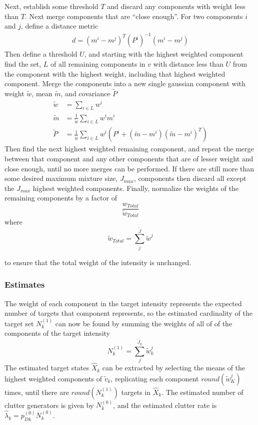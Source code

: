 \documentclass{article}
\begin{document}
Next, establish some threshold $T$ and discard any components with weight less than $T$. Next merge components that are ``close enough''. For two components $i$ and $j$, define a distance metric
\begin{align}
  \label{eq:gauss_dist}
  d = (m^i - m^j)^T(P^i)^{-1}(m^i - m^j)
\end{align}
Then define a threshold $U$, and starting with the highest weighted component find the set, $L$ of all remaining components in $v$ with distance less than $U$ from the component with the highest weight, including that highest weighted component. Merge the components into a new single gaussian component with weight $\tilde{w}$, mean $\tilde{m}$, and covariance $\tilde{P}$
\begin{align}
  \tilde{w} &= \sum_{i \in L}w^i \label{eq:gauss_merge_w}\\
  \tilde{m} &= \frac{1}{\tilde{w}}\sum_{i \in L}w^im^i \label{eq:gauss_merge_m}\\
  \tilde{P} &= \frac{1}{\tilde{w}}\sum_{i \in L}w^i(P^i + (\tilde{m} - m^i)(\tilde{m} - m^i)^T) \label{eq:gauss_merge_P}
\end{align}
Then find the next highest weighted remaining component, and repeat the merge between that component and any other components that are of lesser weight and close enough, until no more merges can be performed. If there are still more than some desired maximum mixture size, $J_{max}$, components then discard all except the $J_{max}$ highest weighted components. Finally, normalize the weights of the remaining components by a factor of
\begin{equation}
  \label{eq:wnorm}
  \frac{w_{Total}}{\tilde{w}_{Total}}
\end{equation}
where
\begin{equation}
  \label{eq:wtild_total}
  \tilde{w}_{Total} = \sum_j^{\tilde{J}}\tilde{w}^j
\end{equation}

to ensure that the total weight of the intensity is unchanged.

\subsubsection*{Estimates}
The weight of each component in the target intensity represents the expected number of targets that component represents, so the estimated cardinality of the target set $N_k^{(1)}$ can now be found by summing the weights of all of of the components of the target intensity
\begin{equation}
  \label{eq:N1k}
  N_k^{(1)} = \sum_j^{\tilde{J}_k}\tilde{w}_k^j
\end{equation}
The estimated target states $\hat{X}_k$ can be extracted by selecting the means of the highest weighted components of $\tilde{v}_k$, replicating each component $round(\tilde{w}_K^j)$ times, until there are $round(N_k^{(1)})$ targets in $\hat{X}_k$. The estimated number of clutter generators is given by $N_k^{(0)}$, and the estimated clutter rate is $\hat{\lambda}_k = p_{Dk}^{(0)}N_k^{(0)}$.
\end{document}
